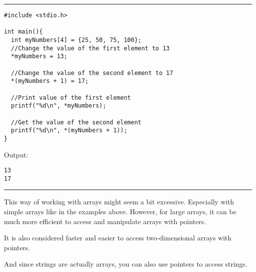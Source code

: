 \documentclass[a4paper]{article}
\begin{document}
\noindent\rule{\textwidth}{0.5pt}
\begin{verbatim}
#include <stdio.h>

int main(){
  int myNumbers[4] = {25, 50, 75, 100};
  //Change the value of the first element to 13
  *myNumbers = 13;

  //Change the value of the second element to 17
  *(myNumbers + 1) = 17;

  //Print value of the first element
  printf("%d\n", *myNumbers);

  //Get the value of the second element
  printf("%d\n", *(myNumbers + 1));
}
\end{verbatim}
Output:
\begin{verbatim}
13
17
\end{verbatim}

\noindent\rule{\textwidth}{0.5pt}
This way of working with arrays might seem a bit excessive. Especially with
simple arrays like in the examples above. However, for large arrays, it can be
much more efficient to access and manipulate arrays with pointers.

It is also considered faster and easier to access two-dimensional arrays with
pointers.

And since strings are actually arrays, you can also use pointers to access
strings.
\end{document}
